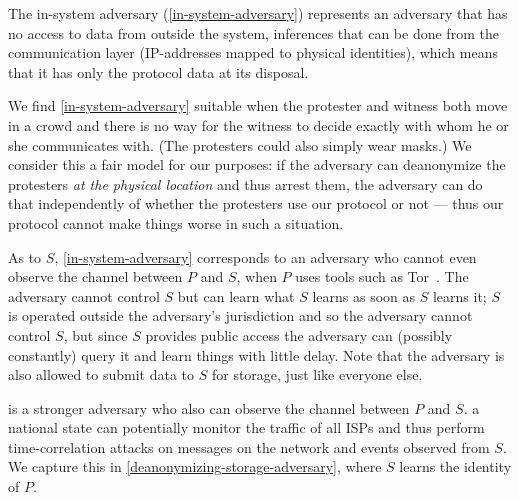 The in-system adversary (\cref{in-system-adversary}) represents an adversary 
that has no access to data from outside the system, \eg inferences that can be 
done from the communication layer (\eg IP-addresses mapped to physical 
identities), which means that it has only the protocol data at its disposal.

We find \cref{in-system-adversary} suitable when the protester and witness both 
move in a crowd and there is no way for the witness to decide exactly with whom 
he or she communicates with.
(The protesters could also simply wear masks.)
We consider this a fair model for our purposes: if the adversary can 
deanonymize the protesters \emph{at the physical location} and thus arrest 
them, the adversary can do that independently of whether the protesters use our 
protocol or not --- thus our protocol cannot make things worse in such a 
situation.

As to \(S\), \cref{in-system-adversary} corresponds to an adversary who cannot 
even observe the channel between \(P\) and \(S\), \eg when \(P\) uses tools 
such as Tor~\cite{Tor}.
The adversary cannot control \(S\) but can learn what \(S\) learns as soon as 
\(S\) learns it; \eg \(S\) is operated outside the adversary's jurisdiction and 
so the adversary cannot control \(S\), but since \(S\) provides public access 
the adversary can (possibly constantly) query it and learn things with little 
delay.
Note that the adversary is also allowed to submit data to \(S\) for storage, 
just like everyone else.

 is a stronger adversary who also can 
observe the channel between \(P\) and \(S\).
\Eg a national state can potentially monitor the traffic of all \acp{ISP} and 
thus perform time-correlation attacks on messages on the network and events 
observed from \(S\).
We capture this in \cref{deanonymizing-storage-adversary}, where \(S\) learns 
the identity of \(P\).

